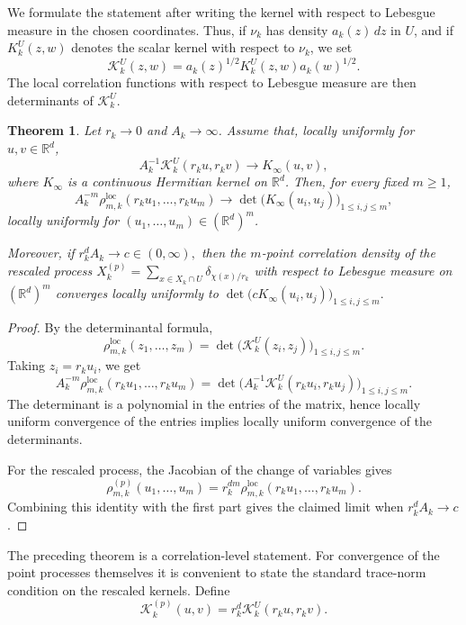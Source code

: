 \documentclass[12pt,a4paper,reqno]{article}
\theoremstyle{thmstyleone}
\newtheorem{theorem}{Theorem}[subsection]
\theoremstyle{thmstylethree}
\theoremstyle{thmstyletwo}
\numberwithin{equation}{subsection}
\def\geq{\geqslant}
\def\leq{\leqslant}
\begin{document}
We formulate the statement after writing the kernel with respect to Lebesgue measure in the chosen coordinates. Thus, if $\nu_k$ has density $a_k(z)\,dz$ in $U$, and if $K_k^U(z,w)$ denotes the scalar kernel with respect to $\nu_k$, we set
\[
    \mathcal K_k^U(z,w)
    =
    a_k(z)^{1/2}K_k^U(z,w)a_k(w)^{1/2}.
\]
The local correlation functions with respect to Lebesgue measure are then determinants of $\mathcal K_k^U$.

\begin{theorem}\label{thm:local-kernel-transfer}
Let $r_k\to0$ and $A_k\to\infty$. Assume that, locally uniformly for
$u,v\in\mathbb R^d$,
\[
    A_k^{-1}
    \mathcal K_k^U(r_k u,r_k v)
    \longrightarrow
    K_\infty(u,v),
\]
where $K_\infty$ is a continuous Hermitian kernel on $\mathbb R^d$. Then, for every fixed $m\geq1$,
\[
    A_k^{-m}
    \rho_{m,k}^{\mathrm{loc}}(r_k u_1,\ldots,r_k u_m)
    \longrightarrow
    \det\big(K_\infty(u_i,u_j)\big)_{1\leq i,j\leq m},
\]
locally uniformly for $(u_1,\ldots,u_m)\in(\mathbb R^d)^m$.

Moreover, if $r_k^d A_k\longrightarrow c\in(0,\infty),$ then the $m$-point correlation density of the rescaled process $X_k^{(p)}=\sum_{x\in X_k\cap U}\delta_{\chi(x)/r_k}$ with respect to Lebesgue measure on $(\mathbb R^d)^m$ converges locally uniformly to $\det\big(cK_\infty(u_i,u_j)\big)_{1\leq i,j\leq m}.$
\end{theorem}

\begin{proof}
By the determinantal formula,
\[
    \rho_{m,k}^{\mathrm{loc}}(z_1,\ldots,z_m)
    =
    \det\big(\mathcal K_k^U(z_i,z_j)\big)_{1\leq i,j\leq m}.
\]
Taking $z_i=r_ku_i$, we get
\[
    A_k^{-m}\rho_{m,k}^{\mathrm{loc}}(r_ku_1,\ldots,r_ku_m)
    =
    \det\big(A_k^{-1}\mathcal K_k^U(r_ku_i,r_ku_j)\big)_{1\leq i,j\leq m}.
\]
The determinant is a polynomial in the entries of the matrix, hence locally uniform convergence of the entries implies locally uniform convergence of the determinants.

For the rescaled process, the Jacobian of the change of variables gives
\[
    \rho_{m,k}^{(p)}(u_1,\ldots,u_m)
    =
    r_k^{dm}\rho_{m,k}^{\mathrm{loc}}(r_ku_1,\ldots,r_ku_m).
\]
Combining this identity with the first part gives the claimed limit when $r_k^dA_k\to c$.
\end{proof}

The preceding theorem is a correlation-level statement. For convergence of the point processes themselves it is convenient to state the standard trace-norm condition on the rescaled kernels. Define
\[
    \mathcal K_k^{(p)}(u,v)
    =
    r_k^d\mathcal K_k^U(r_ku,r_kv).
\]
\end{document}

